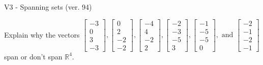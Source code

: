\begin{exercise}
  \begin{exerciseTitle}V3 - Spanning sets (ver. 94)\end{exerciseTitle}
  \begin{exerciseStatement}
    Explain why the vectors \(\left[\begin{array}{r}
-3 \\
0 \\
3 \\
-3
\end{array}\right] , \left[\begin{array}{r}
0 \\
2 \\
-2 \\
-2
\end{array}\right] , \left[\begin{array}{r}
-4 \\
4 \\
-2 \\
2
\end{array}\right] , \left[\begin{array}{r}
-2 \\
-3 \\
-5 \\
3
\end{array}\right] , \left[\begin{array}{r}
-1 \\
-5 \\
-5 \\
0
\end{array}\right] , \text{ and } \left[\begin{array}{r}
-2 \\
-1 \\
-2 \\
-1
\end{array}\right]\) span or don't span \(\mathbb{R}^4\). 
	



\end{exerciseStatement}
\end{exercise}
